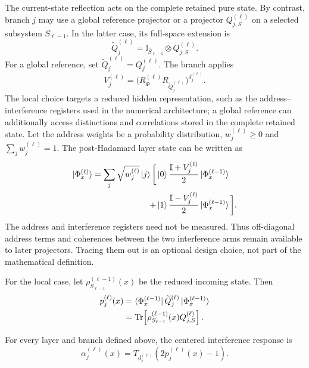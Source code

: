 \documentclass[pdflatex,sn-mathphys,NameDate,iicol]{sn-jnl}
\newcommand{\Tr}{\operatorname{Tr}}
\newcommand{\id}{\mathbb{I}}
\begin{document}
The current-state reflection acts on the complete retained pure state. By
contrast, branch $j$ may use a global reference projector or a projector
$Q_{j,S}^{(\ell)}$ on a selected subsystem $S_{\ell-1}$. In the latter case,
its full-space extension is
\begin{equation}
 \widetilde Q_j^{(\ell)}
 =\id_{\overline S_{\ell-1}}\otimes Q_{j,S}^{(\ell)}.
 \label{eq:deep-local-extension}
\end{equation}
For a global reference, set
$\widetilde Q_j^{(\ell)}=Q_j^{(\ell)}$. The branch applies
\begin{equation}
  V_j^{(\ell)}
  =\bigl(R_{\Phi}^{(\ell)}
           R_{\widetilde Q_j^{(\ell)}}\bigr)^{d_j^{(\ell)}}.
  \label{eq:deep-branch}
\end{equation}
The local choice targets a reduced hidden representation, such as the
address--interference registers used in the numerical architecture; a global
reference can additionally access distinctions and correlations stored in the
complete retained state.
Let the address weights be a probability distribution,
$w_j^{(\ell)}\ge0$ and $\sum_jw_j^{(\ell)}=1$. The post-Hadamard layer state
can be written as
\begin{align}
 \ket{\Phi_x^{(\ell)}}
  =\sum_j\sqrt{w_j^{(\ell)}}\ket j
  \bigg[&\ket0\frac{\id+V_j^{(\ell)}}{2}
          \ket{\Phi_x^{(\ell-1)}} \nonumber\\
       +&\ket1\frac{\id-V_j^{(\ell)}}{2}
          \ket{\Phi_x^{(\ell-1)}}\bigg].
  \label{eq:deep-layer-state}
\end{align}
The address and interference registers need not be measured. Thus
off-diagonal address terms and coherences between the two interference arms
remain available to later projectors. Tracing them out is an optional design
choice, not part of the mathematical definition.

For the local case, let
$\rho_{S_{\ell-1}}^{(\ell-1)}(x)$ be the reduced incoming state. Then
\begin{align}
 p_j^{(\ell)}(x)
 &=\bra{\Phi_x^{(\ell-1)}}\widetilde Q_j^{(\ell)}
       \ket{\Phi_x^{(\ell-1)}}\nonumber\\
 &=\Tr\!\left[
   \rho_{S_{\ell-1}}^{(\ell-1)}(x)Q_{j,S}^{(\ell)}
  \right].
 \label{eq:deep-projector-overlap}
\end{align}

\begin{corollary}
\label{cor:layerwise}
For every layer and branch defined above, the centered interference response
is
\begin{equation}
  \alpha_j^{(\ell)}(x)
  =T_{d_j^{(\ell)}}\!\left(2p_j^{(\ell)}(x)-1\right).
  \label{eq:layerwise-activation}
\end{equation}
\end{corollary}
\end{document}
